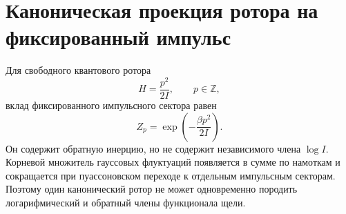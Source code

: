 \section*{Каноническая проекция ротора на фиксированный импульс}

Для свободного квантового ротора
\[
 H=\frac{p^2}{2I},\qquad p\in\mathbb Z,
\]
вклад фиксированного импульсного сектора равен
\[
 Z_p=\exp\!\left(-\frac{\beta p^2}{2I}\right).
\]
Он содержит обратную инерцию, но не содержит независимого члена
\(\log I\). Корневой множитель гауссовых флуктуаций появляется в сумме по
намоткам и сокращается при пуассоновском переходе к отдельным импульсным
секторам. Поэтому один канонический ротор не может одновременно породить
логарифмический и обратный члены функционала щели.